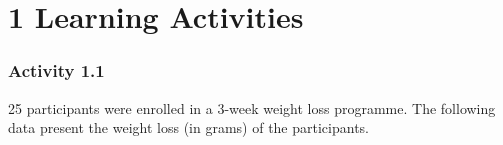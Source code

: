 \documentclass[
]{memoir}
\begin{document}
\hypertarget{learning-activities}{%
\chapter*{\texorpdfstring{\textbf{1} Learning Activities}{1 Learning Activities}}\label{learning-activities}}

\hypertarget{activity-1.1}{%
\subsection*{Activity 1.1}\label{activity-1.1}}

25 participants were enrolled in a 3-week weight loss programme. The following data present the weight loss (in grams) of the participants.

 
  \providecommand{\huxb}[2]{\arrayrulecolor[RGB]{#1}\global\arrayrulewidth=#2pt}
  \providecommand{\huxvb}[2]{\color[RGB]{#1}\vrule width #2pt}
  \providecommand{\huxtpad}[1]{\rule{0pt}{#1}}
  \providecommand{\huxbpad}[1]{\rule[-#1]{0pt}{#1}}
\end{document}
